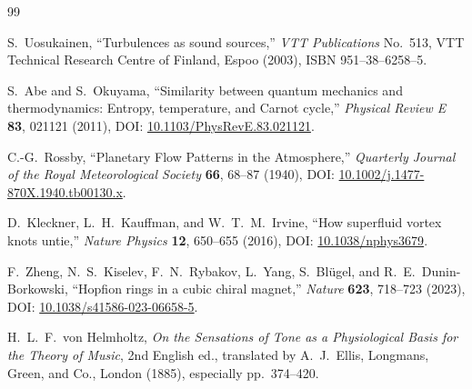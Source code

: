 \begin{thebibliography}{99}

S.~Uosukainen,
``Turbulences as sound sources,''
\emph{VTT Publications} No.~513,
VTT Technical Research Centre of Finland, Espoo (2003),
ISBN 951--38--6258--5.

S.~Abe and S.~Okuyama,
``Similarity between quantum mechanics and thermodynamics: Entropy, temperature, and Carnot cycle,''
\emph{Physical Review E} \textbf{83}, 021121 (2011),
DOI: \href{https://doi.org/10.1103/PhysRevE.83.021121}{10.1103/PhysRevE.83.021121}.

C.-G.~Rossby,
``Planetary Flow Patterns in the Atmosphere,''
\emph{Quarterly Journal of the Royal Meteorological Society} \textbf{66}, 68--87 (1940),
DOI: \href{https://doi.org/10.1002/j.1477-870X.1940.tb00130.x}{10.1002/j.1477-870X.1940.tb00130.x}.

D.~Kleckner, L.~H.~Kauffman, and W.~T.~M.~Irvine,
``How superfluid vortex knots untie,''
\emph{Nature Physics} \textbf{12}, 650--655 (2016),
DOI: \href{https://doi.org/10.1038/nphys3679}{10.1038/nphys3679}.

F.~Zheng, N.~S.~Kiselev, F.~N.~Rybakov, L.~Yang, S.~Bl\"ugel, and R.~E.~Dunin-Borkowski,
``Hopfion rings in a cubic chiral magnet,''
\emph{Nature} \textbf{623}, 718--723 (2023),
DOI: \href{https://doi.org/10.1038/s41586-023-06658-5}{10.1038/s41586-023-06658-5}.

H.~L.~F.~von Helmholtz,
\emph{On the Sensations of Tone as a Physiological Basis for the Theory of Music},
2nd English ed., translated by A.~J.~Ellis,
Longmans, Green, and Co., London (1885), especially pp.~374--420.

\end{thebibliography}
